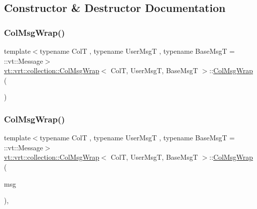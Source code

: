 \subsection{Constructor \& Destructor Documentation}
\mbox{\label{structvt_1_1vrt_1_1collection_1_1_col_msg_wrap_a341d1ea25fb9181d1c06ab66df1478f9}} 
\subsubsection{\texorpdfstring{Col\+Msg\+Wrap()}{ColMsgWrap()}\hspace{0.1cm}{\footnotesize\ttfamily [1/3]}}
{\footnotesize\ttfamily template$<$typename ColT , typename User\+MsgT , typename Base\+MsgT  = \+::vt\+::\+Message$>$ \\
\hyperlink{structvt_1_1vrt_1_1collection_1_1_col_msg_wrap}{vt\+::vrt\+::collection\+::\+Col\+Msg\+Wrap}$<$ ColT, User\+MsgT, Base\+MsgT $>$\+::\hyperlink{structvt_1_1vrt_1_1collection_1_1_col_msg_wrap}{Col\+Msg\+Wrap} (\begin{DoxyParamCaption}{ }\end{DoxyParamCaption})\hspace{0.3cm}{\ttfamily [default]}}

\mbox{\label{structvt_1_1vrt_1_1collection_1_1_col_msg_wrap_a9dfc351adf1f31fda9028608d989ce5c}} 
\subsubsection{\texorpdfstring{Col\+Msg\+Wrap()}{ColMsgWrap()}\hspace{0.1cm}{\footnotesize\ttfamily [2/3]}}
{\footnotesize\ttfamily template$<$typename ColT , typename User\+MsgT , typename Base\+MsgT  = \+::vt\+::\+Message$>$ \\
\hyperlink{structvt_1_1vrt_1_1collection_1_1_col_msg_wrap}{vt\+::vrt\+::collection\+::\+Col\+Msg\+Wrap}$<$ ColT, User\+MsgT, Base\+MsgT $>$\+::\hyperlink{structvt_1_1vrt_1_1collection_1_1_col_msg_wrap}{Col\+Msg\+Wrap} (\begin{DoxyParamCaption}\item[{User\+MsgT \&\&}]{msg }\end{DoxyParamCaption})\hspace{0.3cm}{\ttfamily [inline]}, {\ttfamily [explicit]}}

